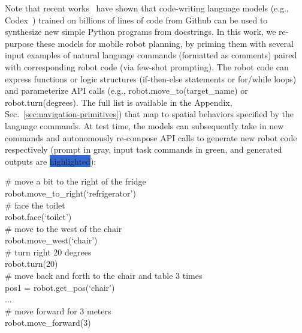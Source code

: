 \documentclass[letterpaper, 10 pt, conference]{ieeeconf}  %
\newcommand{\eg}{e.g., }
\newcommand{\command}[1]{\textcolor{comment-green}{#1}}
\newcommand{\prompt}[1]{\textcolor{prompt-gray}{#1}}
\newcommand{\lmp}[1]{
\begin{tcolorbox}[boxsep=0pt,
                  left=3pt,
                  right=-4pt,
                  top=3pt,
                  bottom=3pt,
                  arc=0pt,
                  boxrule=0.5pt,
                  colframe=light-gray,
                  colback=white
                  ]
\small{  %
\ttfamily
#1
}
\end{tcolorbox}
}
\begin{document}
Note that recent works~\cite{liang2022code,mees22hulc2,chen2021evaluating,brown2020language} have shown that code-writing language models (\eg Codex~\cite{chen2021evaluating}) trained on billions of lines of code from Github can be used to synthesize new simple Python programs from docstrings. In this work, we re-purpose these models for mobile robot planning, by priming them with several input examples of natural language commands (formatted as comments) paired with corresponding robot code (via few-shot prompting). The robot code can express functions or logic structures (if-then-else statements or for/while loops) and parameterize API calls (\eg robot.move\_to(target\_name) or robot.turn(degrees). The full list is available in the Appendix, Sec.~\ref{sec:navigation-primitives}) that map to spatial behaviors specified by the language commands. At test time, the models can subsequently take in new commands and autonomously re-compose API calls to generate new robot code respectively (prompt in {\color{prompt-gray}gray}, input task commands in \command{green}, and generated outputs are \colorbox{highlight}{highlighted}):
\lmp{
\prompt{
\# move a bit to the right of the fridge\\
robot.move\_to\_right(`refrigerator')\\
\# face the toilet\\
robot.face(`toilet')\\
\# move to the west of the chair\\
robot.move\_west(`chair')\\
\# turn right 20 degrees\\
robot.turn(20)\\
\# move back and forth to the chair and table 3 times\\
pos1 = robot.get\_pos(`chair')\\
...\\
\# move forward for 3 meters\\
robot.move\_forward(3)
}}
\end{document}
